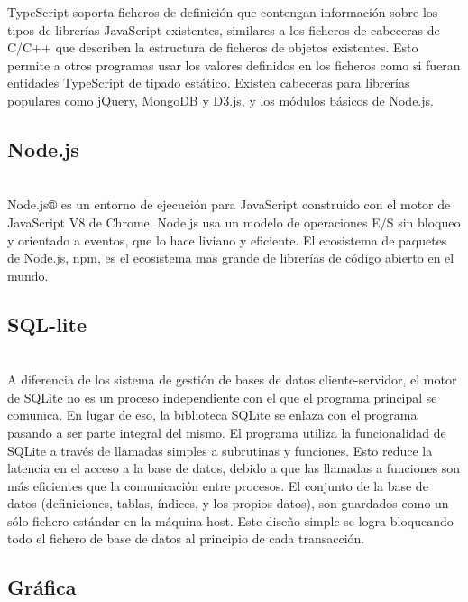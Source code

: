 \documentclass[a4paper, 11pt]{article}
\begin{document}
\begin{itemize}
          TypeScript soporta ficheros de definición que contengan información sobre
          los tipos de librerías JavaScript existentes, similares a los ficheros de
          cabeceras de C/C++ que describen la estructura de ficheros de objetos
          existentes. Esto permite a otros programas usar los valores definidos en
          los ficheros como si fueran entidades TypeScript de tipado estático.
          Existen cabeceras para librerías populares como jQuery, MongoDB y D3.js, y
          los módulos básicos de Node.js.

        \subsection{Node.js}\\

          Node.js® es un entorno de ejecución para JavaScript construido con el
          motor de JavaScript V8 de Chrome. Node.js usa un modelo de operaciones E/S
          sin bloqueo y orientado a eventos, que lo hace liviano y eficiente. El
          ecosistema de paquetes de Node.js, npm, es el ecosistema mas grande de
          librerías de código abierto en el mundo.

        \subsection{SQL-lite}\\

            A diferencia de los sistema de gestión de bases de datos cliente-servidor,
            el motor de SQLite no es un proceso independiente con el que el programa
            principal se comunica. En lugar de eso, la biblioteca SQLite se enlaza con
            el programa pasando a ser parte integral del mismo. El programa utiliza la
            funcionalidad de SQLite a través de llamadas simples a subrutinas y
            funciones. Esto reduce la latencia en el acceso a la base de datos, debido
            a que las llamadas a funciones son más eficientes que la comunicación entre
            procesos. El conjunto de la base de datos (definiciones, tablas, índices,
            y los propios datos), son guardados como un sólo fichero estándar en la
            máquina host. Este diseño simple se logra bloqueando todo el fichero de
            base de datos al principio de cada transacción.


        \subsection{Gráfica}\\


\end{itemize}
\end{document}
